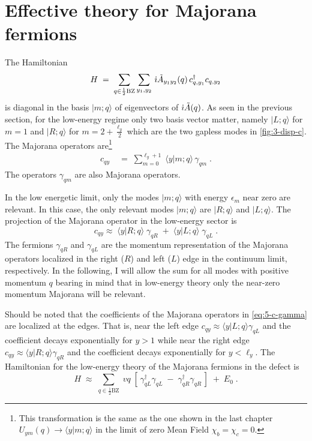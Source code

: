 \section{Effective theory for Majorana fermions}
The Hamiltonian 
\begin{equation}
    H \; = \; \sum_{q \in \frac{1}{2}\text{BZ}} \sum_{y_1,y_2} \, \dot{\imath} \tilde{A}_{y_1y_2}(q) \, c_{q,y_1}^{\dagger} c_{q,y_2} 
\end{equation}
is diagonal in the basis $\vert m; q  \rangle$ of eigenvectors of $\dot{\imath} \tilde{A}(q)$. As seen in the previous section, for the low-energy regime only two basis vector matter, namely $\vert L; q  \rangle $ for  $m=1$ and $\vert R; q  \rangle $ for  $m=2+\frac{\ell_y}{2}$ which are the two gapless modes in \ref{fig:3-disp-c}. The Majorana operators are\footnote{This transformation is the same as the one shown in the last chapter $U_{ym}(q) \to \langle y \vert m; q  \rangle$ in the limit of zero Mean Field $\chi_b=\chi_c=0$.}
\begin{align}
    c_{qy} \; & = \; \sum_{m=0}^{\ell_y+1} \; \langle y \vert m; q  \rangle \, \gamma_{qm} \; .
\end{align}
The operators $\gamma_{qm}$ are also Majorana operators.


In the low energetic limit, only the modes $\vert m ;q \rangle$ with energy $\epsilon_m$ near zero are relevant. In this case, the only relevant modes $\vert m ;q\rangle$  are $\vert R; q  \rangle$ and $\vert L; q  \rangle$. The projection of the  Majorana operator in the low-energy sector is
\begin{equation}
    c_{qy}  \approx \; \langle y \vert R; q  \rangle \;  \gamma_{qR} \; + \;   \langle y \vert L; q  \rangle \;  \gamma_{qL} \; . \label{eq:5-c-gamma}
\end{equation}
The fermions $\gamma_{qR}$ and $\gamma_{qL}$ are the momentum representation of the Majorana operators localized in the right ($R$) and left ($L$) edge in the continuum limit, respectively. In the following, I will allow the sum for all modes with positive momentum $q$ bearing in mind that in low-energy theory only the near-zero momentum Majorana will be relevant. 

Should be noted that the coefficients of the Majorana operators in \eqref{eq:5-c-gamma} are localized at the edges. That is, near the left edge $c_{qy}  \approx \langle y \vert L; q  \rangle \gamma_{qL}$  and the coefficient decays exponentially for $y > 1$ while near the right edge $c_{qy}  \approx \langle y \vert R; q  \rangle \gamma_{qR}$  and the coefficient decays exponentially for $y < \ell_y$. %
The Hamiltonian for the low-energy theory of the Majorana fermions in the defect is 
\begin{equation}
    H \; \approx \; \sum_{q \in \frac{1}{2}\text{BZ}} \; v q \; \left[ \, \gamma_{qL}^{\dagger}\gamma_{qL} \; - \; \gamma_{qR}^{\dagger}\gamma_{qR}   \, \right] \; + \; E_0 \; .
\end{equation}


